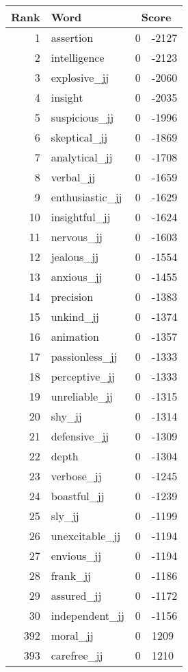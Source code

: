 \begin{longtable}[!htbp]{| rlr@{.}l |}
    \hline
    \textbf{Rank} & \textbf{Word} & \multicolumn{2}{c|}{\textbf{Score}} \\
    \hline
    \endhead
    1 & assertion & 0 & -2127 \\
    2 & intelligence & 0 & -2123 \\
    3 & explosive\_jj & 0 & -2060 \\
    4 & insight & 0 & -2035 \\
    5 & suspicious\_jj & 0 & -1996 \\
    6 & skeptical\_jj & 0 & -1869 \\
    7 & analytical\_jj & 0 & -1708 \\
    8 & verbal\_jj & 0 & -1659 \\
    9 & enthusiastic\_jj & 0 & -1629 \\
    10 & insightful\_jj & 0 & -1624 \\
    11 & nervous\_jj & 0 & -1603 \\
    12 & jealous\_jj & 0 & -1554 \\
    13 & anxious\_jj & 0 & -1455 \\
    14 & precision & 0 & -1383 \\
    15 & unkind\_jj & 0 & -1374 \\
    16 & animation & 0 & -1357 \\
    17 & passionless\_jj & 0 & -1333 \\
    18 & perceptive\_jj & 0 & -1333 \\
    19 & unreliable\_jj & 0 & -1315 \\
    20 & shy\_jj & 0 & -1314 \\
    21 & defensive\_jj & 0 & -1309 \\
    22 & depth & 0 & -1304 \\
    23 & verbose\_jj & 0 & -1245 \\
    24 & boastful\_jj & 0 & -1239 \\
    25 & sly\_jj & 0 & -1199 \\
    26 & unexcitable\_jj & 0 & -1194 \\
    27 & envious\_jj & 0 & -1194 \\
    28 & frank\_jj & 0 & -1186 \\
    29 & assured\_jj & 0 & -1172 \\
    30 & independent\_jj & 0 & -1156 \\
    392 & moral\_jj & 0 & 1209 \\
    393 & carefree\_jj & 0 & 1210 \\

\end{longtable}
